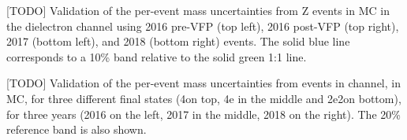\begin{multiFigure}
    \centering
        [TODO]
        {Validation of the per-event mass uncertainties from Z events in MC in the dielectron channel using 2016 pre-VFP (top left), 2016 post-VFP (top right), 2017 (bottom left), and 2018 (bottom right) events.
		The solid blue line corresponds to a 10\% band relative to the solid green 1:1 line.}
    \label{fig:ZClosure_test_ELE}
\end{multiFigure}
\begin{multiFigure}
    \centering


        [TODO]
        {Validation of the per-event mass uncertainties from events in \gghtofourl channel, in MC, 
		for three different final states (4\Pmu on top, 4e in the middle and 2e2\Pmu on bottom), 
		for three years (2016 on the left, 2017 in the middle, 2018 on the right).
		The 20\% reference band is also shown.}
    \label{fig:HClosure_test}
\end{multiFigure}

